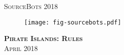 \documentclass[twoside,12pt,a4paper,titlepage]{article}
\title{\gamename}
\author{\org}
\date{\timeline}
\newcommand{\gamename}{Pirate Islands\xspace}
\newcommand{\timeline}{April 2018\xspace}
\begin{document}
\begin{titlepage}
\begin{center}
\textsc{\large SourceBots 2018}\\[3.5cm]
\begin{figure}
    \centering
    \texttt{[image: fig-sourcebots.pdf]}
\end{figure}
\textsc{\huge \textbf{\gamename{}: Rules}}\\[1cm]
\textsc{\large \timeline}\\[3cm]
\end{center}
\end{titlepage}


\clearpage

\clearpage

\end{document}
